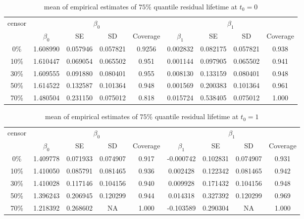 \documentclass[12pt]{article}
\begin{document}
	\begin{table}[hbt!]
		\caption{mean of empirical estimates of $75\%$ quantile residual lifetime at $t_0=0$}
		\centering
		\begin{tabular}{|c|c|c|c|c|c|c|c|c|}
			\hline
			\multirow{2}{*}{censor} & \multicolumn{4}{c|}{$\beta_0$} & \multicolumn{4}{c|}{$\beta_1$}\\ \cline{2-9}
			& $\beta_0$ & SE & SD  & Coverage  & $\beta_1$ & SE & SD & Coverage\\
			\hline\hline
			0\% & 1.608990 & 0.057946 & 0.057821 & 0.9256 & 0.002832 & 0.082175 & 0.057821 & 0.938 \\
			10\% & 1.610447 & 0.069054 & 0.065502 & 0.951 & 0.001144 & 0.097905 & 0.065502 & 0.941 \\
			30\% & 1.609555 & 0.091880 & 0.080401 & 0.955 & 0.008130 & 0.133159 & 0.080401 & 0.948 \\
			50\% & 1.614522 & 0.132587 & 0.101364 & 0.948 & 0.001569 & 0.200383 & 0.101364 & 0.961 \\
			70\% & 1.480504 & 0.231150 & 0.075012 & 0.818 & 0.015724 & 0.538405 & 0.075012 & 1.000 \\   
			\hline
		\end{tabular}
	\end{table}
	\begin{table}[hbt!]
		\caption{mean of empirical estimates of $75\%$ quantile residual lifetime at $t_0=1$}
		\centering
		\begin{tabular}{|c|c|c|c|c|c|c|c|c|}
			\hline
			\multirow{2}{*}{censor} & \multicolumn{4}{c|}{$\beta_0$} & \multicolumn{4}{c|}{$\beta_1$}\\ \cline{2-9}
			& $\beta_0$ & SE & SD  & Coverage  & $\beta_1$ & SE & SD & Coverage\\
			\hline\hline
			0\% & 1.409778 & 0.071933 & 0.074907 & 0.917 & -0.000742 & 0.102831 & 0.074907 & 0.931 \\
			10\% & 1.410050 & 0.085791 & 0.081465 & 0.936 & 0.002428 & 0.122342 & 0.081465 & 0.942 \\
			30\% & 1.410028 & 0.117146 & 0.104156 & 0.940 & 0.009928 & 0.171432 & 0.104156 & 0.948 \\
			50\% & 1.396243 & 0.206945 & 0.120299 & 0.944 & 0.014318 & 0.327392 & 0.120299 & 0.969 \\
			70\% & 1.218392 & 0.268602 & NA & 1.000 & -0.103589 & 0.290304 & NA & 1.000 \\ 
			
			\hline
		\end{tabular}
	\end{table}
\end{document}
